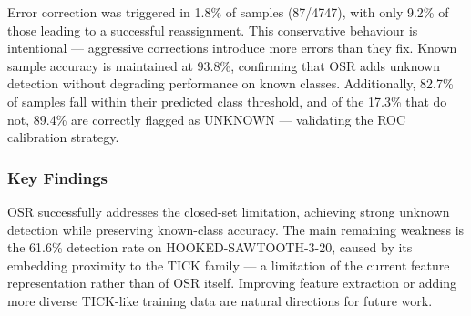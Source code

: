 Error correction was triggered in 1.8\% of samples (87/4747), with only 9.2\% of those leading to a successful reassignment. This conservative behaviour is intentional — aggressive corrections introduce more errors than they fix. Known sample accuracy is maintained at 93.8\%, confirming that OSR adds unknown detection without degrading performance on known classes. Additionally, 82.7\% of samples fall within their predicted class threshold, and of the 17.3\% that do not, 89.4\% are correctly flagged as UNKNOWN — validating the ROC calibration strategy.

\subsubsection{Key Findings}

OSR successfully addresses the closed-set limitation, achieving strong unknown detection while preserving known-class accuracy. The main remaining weakness is the 61.6\% detection rate on HOOKED-SAWTOOTH-3-20, caused by its embedding proximity to the TICK family — a limitation of the current feature representation rather than of OSR itself. Improving feature extraction or adding more diverse TICK-like training data are natural directions for future work.
